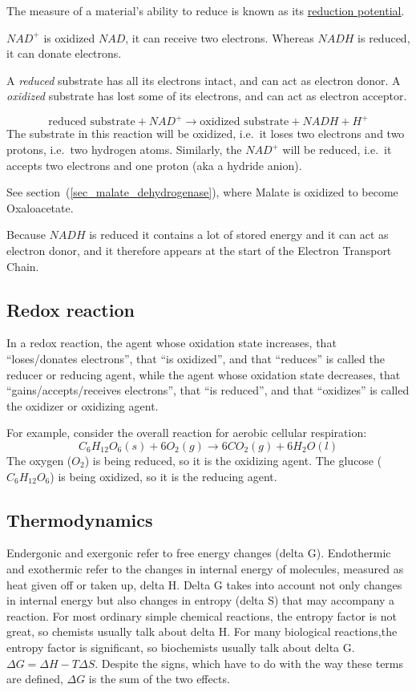\documentclass{article}
\begin{document}
The measure of a material's ability to reduce is known as its
\href{https://en.wikipedia.org/wiki/Reduction_potential}{reduction potential}.

$NAD^+$ is oxidized $NAD$, it can receive two electrons.
Whereas $NADH$ is reduced, it can donate electrons.

A {\em reduced\/} substrate has all its electrons intact, and can act as electron donor.
A {\em oxidized\/} substrate has lost some of its electrons, and can act as electron
acceptor.

\[
    \text{reduced substrate} + NAD^+ \rightarrow \text{oxidized substrate} + NADH + H^+
\]
The substrate in this reaction will be oxidized, i.e.\ it loses two electrons and two
protons, i.e.\ two hydrogen atoms. Similarly, the $NAD^+$ will be reduced, i.e.\ it
accepts two electrons and one proton (aka a hydride anion).

See section~(\ref{sec_malate_dehydrogenase}), where Malate is oxidized to become
Oxaloacetate.

Because $NADH$ is reduced it contains a lot of stored energy and it can act as electron
donor, and it therefore appears at the start of the Electron Transport Chain.


\subsection{Redox reaction}
In a redox reaction, the agent whose oxidation state increases, that ``loses/donates
electrons'', that ``is oxidized'', and that ``reduces'' is called the reducer or reducing
agent, while the agent whose oxidation state decreases, that ``gains/accepts/receives
electrons'', that ``is reduced'', and that ``oxidizes'' is called the oxidizer or
oxidizing agent.

For example, consider the overall reaction for aerobic cellular respiration:
\[
    C_6H_{12}O_6(s) + 6O_2(g) \rightarrow 6CO_2(g) + 6H_2O(l)
\]
The oxygen ($O_2$) is being reduced, so it is the oxidizing agent. The glucose
($C_6H_{12}O_6$) is being oxidized, so it is the reducing agent.

\subsection{Thermodynamics}
Endergonic and exergonic refer to free energy changes (delta G). Endothermic and
exothermic refer to the changes in internal energy of molecules, measured as heat given
off or taken up, delta H. Delta G takes into account not only changes in internal energy
but also changes in entropy (delta S) that may accompany a reaction. For most ordinary
simple chemical reactions, the entropy factor is not great, so chemists usually talk about
delta H. For many biological reactions,the entropy factor is significant, so biochemists
usually talk about delta G. $\Delta G = \Delta H - T \Delta S $. Despite the signs, which
have to do with the way these terms are defined, $\Delta G$ is the sum of the two effects.
\end{document}
